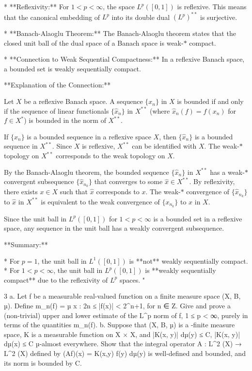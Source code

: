 * **Reflexivity:** For $1 < p < \infty$, the space $L^p([0, 1])$ is reflexive. This means that the canonical embedding of $L^p$ into its double dual $(L^p)^{**}$ is surjective.

* **Banach-Alaoglu Theorem:** The Banach-Alaoglu theorem states that the closed unit ball of the dual space of a Banach space is weak-$*$ compact.

* **Connection to Weak Sequential Compactness:** In a reflexive Banach space, a bounded set is weakly sequentially compact.

**Explanation of the Connection:**

Let $X$ be a reflexive Banach space. A sequence $\{x_n\}$ in $X$ is bounded if and only if the sequence of linear functionals $\{\hat{x}_n\}$ in $X^{**}$ (where $\hat{x}_n(f) = f(x_n)$ for $f \in X^*$) is bounded in the norm of $X^{**}$.

If $\{x_n\}$ is a bounded sequence in a reflexive space $X$, then $\{\hat{x}_n\}$ is a bounded sequence in $X^{**}$. Since $X$ is reflexive, $X^{**}$ can be identified with $X$. The weak-$*$ topology on $X^{**}$ corresponds to the weak topology on $X$.

By the Banach-Alaoglu theorem, the bounded sequence $\{\hat{x}_n\}$ in $X^{**}$ has a weak-$*$ convergent subsequence $\{\hat{x}_{n_k}\}$ that converges to some $\hat{x} \in X^{**}$. By reflexivity, there exists $x \in X$ such that $\hat{x}$ corresponds to $x$. The weak-$*$ convergence of $\{\hat{x}_{n_k}\}$ to $\hat{x}$ in $X^{**}$ is equivalent to the weak convergence of $\{x_{n_k}\}$ to $x$ in $X$.

Since the unit ball in $L^p([0, 1])$ for $1 < p < \infty$ is a bounded set in a reflexive space, any sequence in the unit ball has a weakly convergent subsequence.

**Summary:**

* For $p = 1$, the unit ball in $L^1([0, 1])$ is **not** weakly sequentially compact.
* For $1 < p < \infty$, the unit ball in $L^p([0, 1])$ is **weakly sequentially compact** due to the reflexivity of $L^p$ spaces.
"

3
a. Let f be a measurable real-valued function on a finite measure space (X, B, µ). Define m_n(f) = µ {x : 2n ≤ |f(x)| < 2^{n+1}}, for n ∈ Z. Give and prove a (non-trivial) upper and lower estimate of the L^p norm of f, 1 ≤ p < ∞, purely in terms of the quantities m_n(f).
b. Suppose that (X, B, µ) is a \sigma-finite measure space, K is a measurable function on X × X, and \int |K(x, y)| dµ(y) ≤ C, \int |K(x, y)| dµ(x) ≤ C
µ-almost everywhere. Show that the integral operator A : L^2 (X) → L^2 (X) defined by (Af)(x) = \int K(x,y) f(y) dµ(y) is well-defined and bounded, and its norm is bounded by C.

